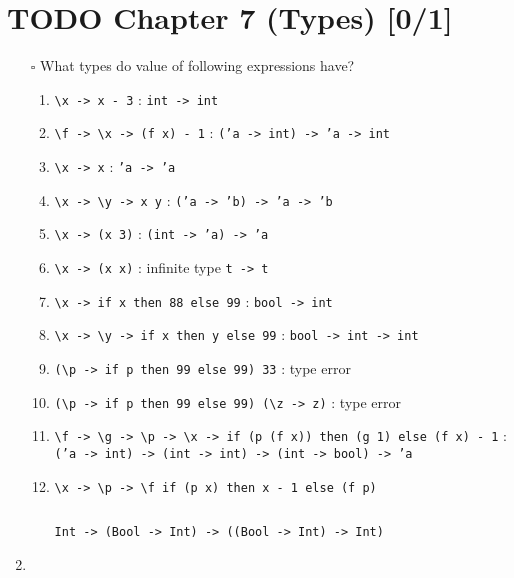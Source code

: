 \documentclass[11pt]{article}
\begin{document}
\section{{\bfseries\sffamily TODO} Chapter 7 (Types) [0/1]}
\label{sec:org8b76e7e}
\begin{enumerate}
\item[{$\square$}] What types do value of following expressions have?
\begin{enumerate}
\item \texttt{\textbackslash{}x -> x - 3} :
\texttt{int -> int}
\item \texttt{\textbackslash{}f -> \textbackslash{}x -> (f x) - 1} :
\texttt{('a -> int) -> 'a -> int}
\item \texttt{\textbackslash{}x -> x} : 
\texttt{'a -> 'a}
\item \texttt{\textbackslash{}x -> \textbackslash{}y -> x y} :
\texttt{('a -> 'b) -> 'a -> 'b}
\item \texttt{\textbackslash{}x -> (x 3)} :
\texttt{(int -> 'a) -> 'a}
\item \texttt{\textbackslash{}x -> (x x)} :
infinite type \texttt{t -> t}
\item \texttt{\textbackslash{}x -> if x then 88 else 99} :
\texttt{bool -> int}
\item \texttt{\textbackslash{}x -> \textbackslash{}y -> if x then y else 99} :
\texttt{bool -> int -> int}
\item \texttt{(\textbackslash{}p -> if p then 99 else 99) 33} :
type error
\item \texttt{(\textbackslash{}p -> if p then 99 else 99) (\textbackslash{}z -> z)} :
type error
\item \texttt{\textbackslash{}f -> \textbackslash{}g -> \textbackslash{}p -> \textbackslash{}x -> if (p (f x)) then (g 1) else (f x) - 1} : 
\texttt{('a -> int) -> (int -> int) -> (int -> bool) -> 'a}
\item \begin{verbatim}
\x -> \p -> \f if (p x) then x - 1 else (f p)
\end{verbatim}
\begin{verbatim}

\end{verbatim}
\begin{verbatim}
Int -> (Bool -> Int) -> ((Bool -> Int) -> Int)
\end{verbatim}
\end{enumerate}
\item 
\end{enumerate}
\end{document}
